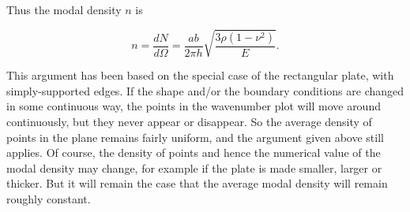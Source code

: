  Thus the modal density $n$ is 

  $$n=\dfrac{dN}{d \Omega} = \dfrac{ab}{2 \pi h} \sqrt{\dfrac{3 \rho 
  (1-\nu^2)}{E}} . \tag{6}$$ 

  This argument has been based on the special case of the rectangular plate, 
  with simply-supported edges. If the shape and/or the boundary conditions are 
  changed in some continuous way, the points in the wavenumber plot will move 
  around continuously, but they never appear or disappear. So the average 
  density of points in the plane remains fairly uniform, and the argument given 
  above still applies. Of course, the density of points and hence the numerical 
  value of the modal density may change, for example if the plate is made 
  smaller, larger or thicker. But it will remain the case that the average 
  modal density will remain roughly constant. 